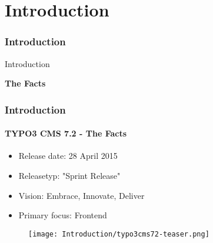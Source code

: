 %

\section{Introduction}
\begin{frame}[fragile]
	\frametitle{Introduction}

	\begin{center}\huge{Introduction}\end{center}
	\begin{center}\huge{\color{typo3darkgrey}\textbf{The Facts}}\end{center}

\end{frame}

\begin{frame}[fragile]
	\frametitle{Introduction}
	\framesubtitle{TYPO3 CMS 7.2 - The Facts}

	\begin{itemize}
		\item Release date: 28 April 2015
		\item Releasetyp: "Sprint Release"
		\item Vision: Embrace, Innovate, Deliver
		\item Primary focus: Frontend
	\end{itemize}

	\begin{figure}
		\texttt{[image: Introduction/typo3cms72-teaser.png]}
	\end{figure}

\end{frame}

